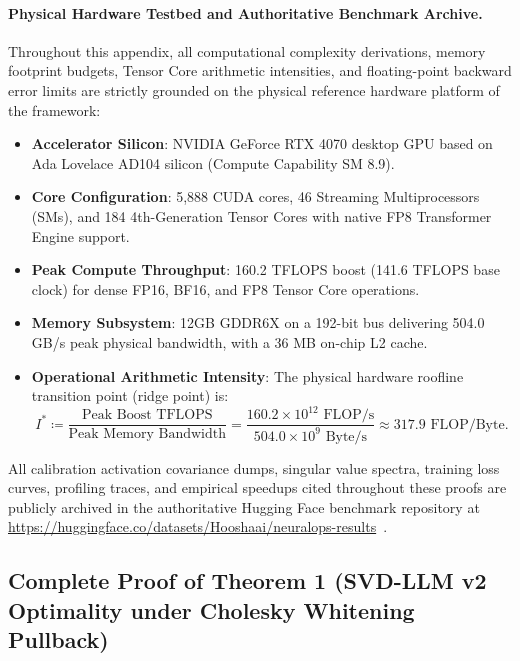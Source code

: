 \paragraph{Physical Hardware Testbed and Authoritative Benchmark Archive.}
Throughout this appendix, all computational complexity derivations, memory footprint budgets, Tensor Core arithmetic intensities, and floating-point backward error limits are strictly grounded on the physical reference hardware platform of the \neuralops{} framework:
\begin{itemize}
    \item \textbf{Accelerator Silicon}: NVIDIA GeForce RTX 4070 desktop GPU based on Ada Lovelace AD104 silicon (Compute Capability SM 8.9).
    \item \textbf{Core Configuration}: 5,888 CUDA cores, 46 Streaming Multiprocessors (SMs), and 184 4th-Generation Tensor Cores with native FP8 Transformer Engine support.
    \item \textbf{Peak Compute Throughput}: 160.2 TFLOPS boost (141.6 TFLOPS base clock) for dense FP16, BF16, and FP8 Tensor Core operations.
    \item \textbf{Memory Subsystem}: 12GB GDDR6X on a 192-bit bus delivering 504.0 GB/s peak physical bandwidth, with a 36 MB on-chip L2 cache.
    \item \textbf{Operational Arithmetic Intensity}: The physical hardware roofline transition point (ridge point) is:
    \begin{equation}
    I^* \coloneqq \frac{\text{Peak Boost TFLOPS}}{\text{Peak Memory Bandwidth}} = \frac{160.2 \times 10^{12}\text{ FLOP/s}}{504.0 \times 10^9\text{ Byte/s}} \approx 317.9\text{ FLOP/Byte}.
    \label{eq:rtx4070_ridge_point_prelim}
    \end{equation}
\end{itemize}
All calibration activation covariance dumps, singular value spectra, training loss curves, profiling traces, and empirical speedups cited throughout these proofs are publicly archived in the authoritative Hugging Face benchmark repository at \url{https://huggingface.co/datasets/Hooshaai/neuralops-results}~\cite{neuralops_results_hf}.

\subsection{Complete Proof of Theorem 1 (SVD-LLM v2 Optimality under Cholesky Whitening Pullback)}
\label{sec:appendix_a2_thm1}


